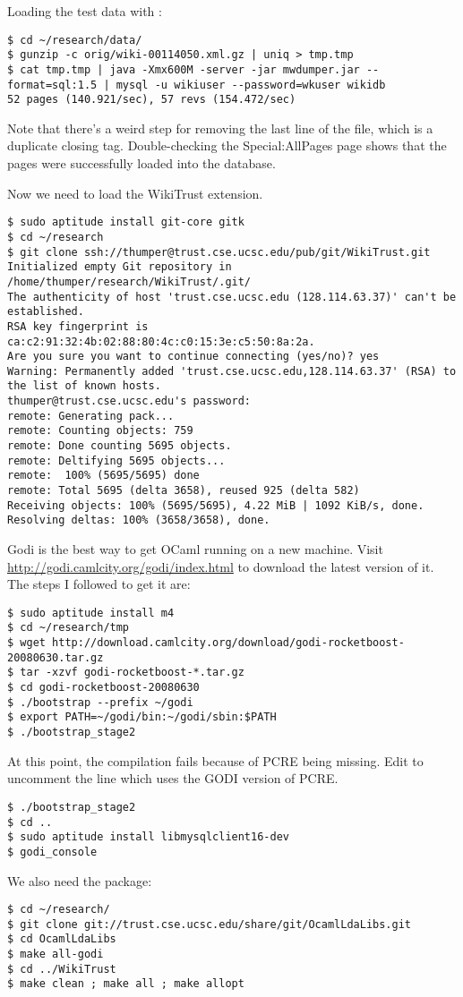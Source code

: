 Loading the test data with :
\begin{verbatim}
$ cd ~/research/data/
$ gunzip -c orig/wiki-00114050.xml.gz | uniq > tmp.tmp
$ cat tmp.tmp | java -Xmx600M -server -jar mwdumper.jar --format=sql:1.5 | mysql -u wikiuser --password=wkuser wikidb
52 pages (140.921/sec), 57 revs (154.472/sec)
\end{verbatim}
Note that there's a weird step for removing the last line of
the file, which is a duplicate closing tag.
Double-checking the Special:AllPages page shows that
the pages were successfully loaded into the database.

Now we need to load the WikiTrust extension.
\begin{verbatim}
$ sudo aptitude install git-core gitk
$ cd ~/research
$ git clone ssh://thumper@trust.cse.ucsc.edu/pub/git/WikiTrust.git
Initialized empty Git repository in /home/thumper/research/WikiTrust/.git/
The authenticity of host 'trust.cse.ucsc.edu (128.114.63.37)' can't be established.
RSA key fingerprint is ca:c2:91:32:4b:02:88:80:4c:c0:15:3e:c5:50:8a:2a.
Are you sure you want to continue connecting (yes/no)? yes
Warning: Permanently added 'trust.cse.ucsc.edu,128.114.63.37' (RSA) to the list of known hosts.
thumper@trust.cse.ucsc.edu's password: 
remote: Generating pack...
remote: Counting objects: 759
remote: Done counting 5695 objects.
remote: Deltifying 5695 objects...
remote:  100% (5695/5695) done
remote: Total 5695 (delta 3658), reused 925 (delta 582)
Receiving objects: 100% (5695/5695), 4.22 MiB | 1092 KiB/s, done.
Resolving deltas: 100% (3658/3658), done.
\end{verbatim}

Godi is the best way to get OCaml running on a new machine.
Visit \url{http://godi.camlcity.org/godi/index.html} to download
the latest version of it.
The steps I followed to get it are:
\begin{verbatim}
$ sudo aptitude install m4
$ cd ~/research/tmp
$ wget http://download.camlcity.org/download/godi-rocketboost-20080630.tar.gz
$ tar -xzvf godi-rocketboost-*.tar.gz
$ cd godi-rocketboost-20080630
$ ./bootstrap --prefix ~/godi
$ export PATH=~/godi/bin:~/godi/sbin:$PATH
$ ./bootstrap_stage2
\end{verbatim}
At this point, the compilation fails because of PCRE being missing.
Edit  to uncomment the line which
uses the GODI version of PCRE.
\begin{verbatim}
$ ./bootstrap_stage2
$ cd ..
$ sudo aptitude install libmysqlclient16-dev
$ godi_console
\end{verbatim}
We also need the  package:
\begin{verbatim}
$ cd ~/research/
$ git clone git://trust.cse.ucsc.edu/share/git/OcamlLdaLibs.git
$ cd OcamlLdaLibs
$ make all-godi
$ cd ../WikiTrust
$ make clean ; make all ; make allopt
\end{verbatim}


